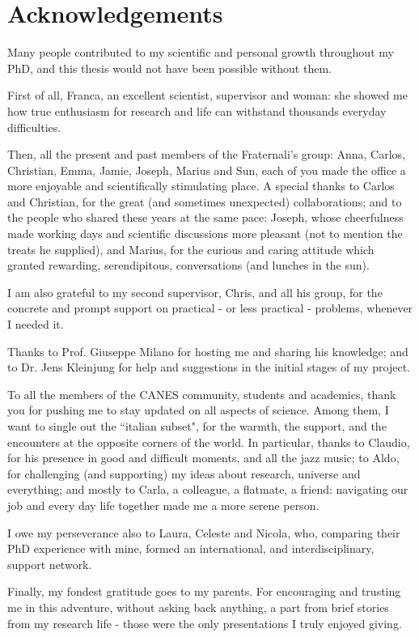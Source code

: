 \chapter*{Acknowledgements}
%
\begin{onehalfspacing}
Many people contributed to my scientific and personal growth throughout my PhD, and this thesis would not have been possible without them.

First of all, Franca, an excellent scientist, supervisor and woman: she showed me how true enthusiasm for research and life can withstand thousands everyday difficulties.

Then, all the present and past members of the Fraternali's group: Anna, Carlos, Christian, Emma, Jamie, Joseph, Marius and Sun, each of you made the office a more enjoyable and scientifically stimulating place. A special thanks to Carlos and Christian, for the great (and sometimes unexpected) collaborations; and to the people who shared these years at the same pace: Joseph, whose cheerfulness made working days and scientific discussions more pleasant (not to mention the treats he supplied), and Marius, for the curious and caring attitude which granted rewarding, serendipitous, conversations (and lunches in the sun).

I am also grateful to my second supervisor, Chris, and all his group, for the concrete and prompt support on practical - or less practical - problems, whenever I needed it.

Thanks to Prof. Giuseppe Milano for hosting me and sharing his knowledge; and to Dr. Jens Kleinjung for help and suggestions in the initial stages of my project.

To all the members of the CANES community, students and academics, thank you for pushing me to stay updated on all aspects of science. Among them, I want to single out the ``italian subset", for the warmth, the support, and the encounters at the opposite corners of the world. In particular, thanks to Claudio, for his presence in good and difficult moments, and all the jazz music; to Aldo, for challenging (and supporting) my ideas about research, universe and everything; and mostly to Carla, a colleague, a flatmate, a friend: navigating our job and every day life together made me a more serene person.

I owe my perseverance also to Laura, Celeste and Nicola, who, comparing their PhD experience with mine, formed an international, and interdisciplinary, support network.

Finally, my fondest gratitude goes to my parents. For encouraging and trusting me in this adventure, without asking back anything, a part from brief stories from my research life - those were the only presentations I truly enjoyed giving.

\end{onehalfspacing}



